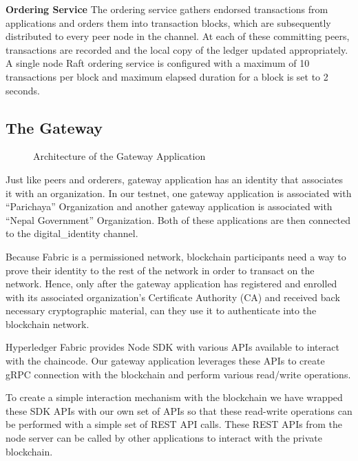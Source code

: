 \textbf{Ordering Service} \newline
The ordering service gathers endorsed transactions from applications and orders them into transaction blocks, which are subsequently distributed to every peer node in the channel. At each of these committing peers, transactions are recorded and the local copy of the ledger updated appropriately. A single node Raft ordering service is configured with a maximum of 10 transactions per block and maximum elapsed duration for a block is set to 2 seconds.
\subsection{The Gateway}
\vspace{15 pt}
\begin{figure}[H]
\centerline{}
\caption{Architecture of the Gateway Application}
\label{fig: GatewayArchitecture.svg}
\end{figure}
\newpage
Just like peers and orderers, gateway application has an identity that associates it with an organization. In our testnet, one gateway application is associated with “Parichaya” Organization and another gateway application is associated with “Nepal Government” Organization. Both of these applications are then connected to the digital\_identity channel. 

Because Fabric is a permissioned network, blockchain participants need a way to prove their identity to the rest of the network in order to transact on the network. Hence, only after the gateway application has registered and enrolled with its associated organization’s Certificate Authority (CA) and received back necessary cryptographic material, can they use it to authenticate into the blockchain network. 

Hyperledger Fabric provides Node SDK with various APIs available to interact with the chaincode. Our gateway application leverages these APIs to create gRPC connection with the blockchain and perform various read/write operations.

To create a simple interaction mechanism with the blockchain we have wrapped these SDK APIs with our own set of APIs so that these read-write operations can be performed with a simple set of REST API calls. These REST APIs from the node server can be called by other applications to interact with the private blockchain.

